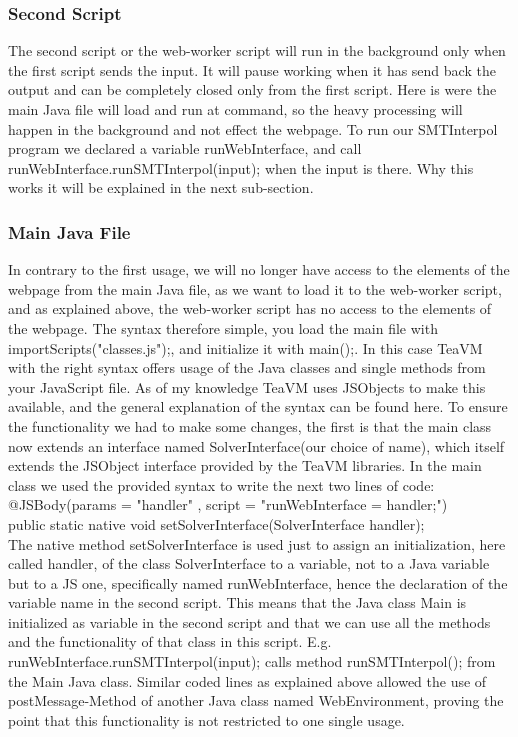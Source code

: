 \documentclass[12pt]{article}
\begin{document}
\subsubsection{Second Script} The second script or the web-worker script will run in the background only when the first script sends the input. It will pause working when it has send back the output and can be completely closed only from the first script.
Here is were the main Java file will load and run at command, so the heavy processing will happen in the background and not effect the webpage. To run our SMTInterpol program we declared a variable runWebInterface, and call runWebInterface.runSMTInterpol(input); when the input is there. Why this works it will be explained in the next sub-section.

\subsubsection{Main Java File}

In contrary to the first usage, we will no longer have access to the elements of the webpage from the main Java file, as we want to load it to the web-worker script, and as explained above, the web-worker script has no access to the elements of the webpage. The syntax therefore simple, you load the main file with importScripts("classes.js");, and initialize it with main();. In this case TeaVM with the right syntax offers usage of the Java classes and single methods from your JavaScript file. As of my knowledge TeaVM uses JSObjects to make this available, and the general explanation of the syntax can be found here\cite{3}. To ensure the functionality we had to make some changes, the first is that the main class now extends an interface named SolverInterface(our choice of name), which itself extends the JSObject interface provided by the TeaVM libraries. In the main class we used the provided syntax to write the next two lines of code: \\
@JSBody(params = { "handler" }, script = "runWebInterface = handler;") \\
public static native void setSolverInterface(SolverInterface handler); \\
The native method setSolverInterface is used just to assign an initialization,  here called handler, of the class SolverInterface to a variable, not to a  Java variable but to a JS one, specifically named runWebInterface, hence the declaration of the variable name in the second script. This means that the Java class Main is initialized as variable in the second script and that we can use all the methods and the functionality of that class in this script. E.g. runWebInterface.runSMTInterpol(input); calls method runSMTInterpol(); from the Main Java class.
Similar coded lines as explained above allowed the use of postMessage-Method of another Java class named WebEnvironment, proving the point that this functionality is not restricted to one single usage.
\end{document}
